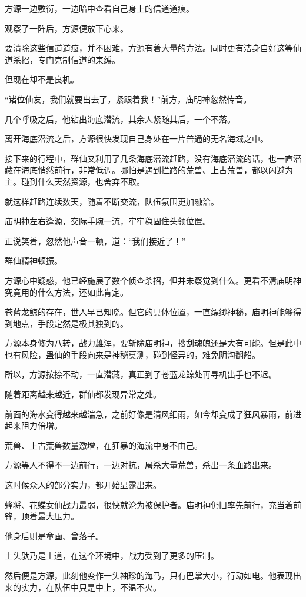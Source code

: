 \begin{this_body}
方源一边敷衍，一边暗中查看自己身上的信道道痕。

观察了一阵后，方源便放下心来。

要清除这些信道道痕，并不困难，方源有着大量的方法。同时更有洁身自好这等仙道杀招，专门克制信道的束缚。

但现在却不是良机。

“诸位仙友，我们就要出去了，紧跟着我！”前方，庙明神忽然传音。

几个呼吸之后，他钻出海底潜流，其余人紧随其后，一个不落。

离开海底潜流之后，方源很快发现自己身处在一片普通的无名海域之中。

接下来的行程中，群仙又利用了几条海底潜流赶路，没有海底潜流的话，也一直潜藏在海底悄然前行，非常低调。哪怕是遇到拦路的荒兽、上古荒兽，都以闪避为主。碰到什么天然资源，也舍弃不取。

就这样赶路连续数天，随着不断交流，队伍氛围更加融洽。

庙明神左右逢源，交际手腕一流，牢牢稳固住头领位置。

正说笑着，忽然他声音一顿，道：“我们接近了！”

群仙精神顿振。

方源心中疑惑，他已经施展了数个侦查杀招，但并未察觉到什么。更看不清庙明神究竟用的什么方法，还如此肯定。

苍蓝龙鲸的存在，世人早已知晓。但它的具体位置，一直缥缈神秘，庙明神能够得到地点，手段定然是极其独到的。

方源本身修为八转，战力雄浑，要斩除庙明神，搜刮魂魄还是大有可能。但是此中也有风险，蛊仙的手段向来是神秘莫测，碰到怪异的，难免阴沟翻船。

所以，方源按捺不动，一直潜藏，真正到了苍蓝龙鲸处再寻机出手也不迟。

随着距离越来越近，群仙都发现异常之处。

前面的海水变得越来越湍急，之前好像是清风细雨，如今却变成了狂风暴雨，前进起来阻力倍增。

荒兽、上古荒兽数量激增，在狂暴的海流中身不由己。

方源等人不得不一边前行，一边对抗，屠杀大量荒兽，杀出一条血路出来。

这时候众人的部分实力，都开始显露出来。

蜂将、花蝶女仙战力最弱，很快就沦为被保护者。庙明神仍旧率先前行，充当着前锋，顶着最大压力。

他身后则是童画、曾落子。

土头驮乃是土道，在这个环境中，战力受到了更多的压制。

然后便是方源，此刻他变作一头袖珍的海马，只有巴掌大小，行动如电。他表现出来的实力，在队伍中只是中上，不温不火。


\end{this_body}
